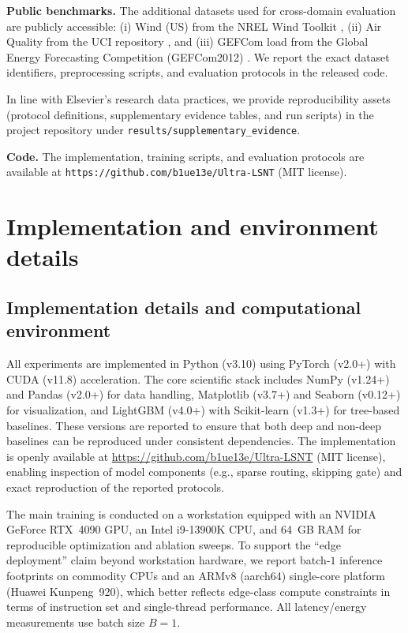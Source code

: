 \documentclass[review,3p,times]{elsarticle}
\begin{document}
\textbf{Public benchmarks.} The additional datasets used for cross-domain evaluation are publicly accessible: (i) Wind (US) from the NREL Wind Toolkit \cite{draxl2015windtoolkit}, (ii) Air Quality from the UCI repository \cite{devito2008}, and (iii) GEFCom load from the Global Energy Forecasting Competition (GEFCom2012) \cite{Hong2014GEFCom2012}. We report the exact dataset identifiers, preprocessing scripts, and evaluation protocols in the released code.

In line with Elsevier's research data practices, we provide reproducibility assets (protocol definitions, supplementary evidence tables, and run scripts) in the project repository under \texttt{results/supplementary\_evidence}.

\textbf{Code.} The implementation, training scripts, and evaluation protocols are available at \texttt{https://github.com/b1ue13e/Ultra-LSNT} (MIT license).

\appendix

\section{Implementation and environment details}\label{app:impl_details}

\subsection{Implementation details and computational environment}
\label{app:impl_details_sub}

All experiments are implemented in Python (v3.10) using PyTorch (v2.0+) with CUDA (v11.8) acceleration. The core scientific stack includes NumPy (v1.24+) and Pandas (v2.0+) for data handling, Matplotlib (v3.7+) and Seaborn (v0.12+) for visualization, and LightGBM (v4.0+) with Scikit-learn (v1.3+) for tree-based baselines. These versions are reported to ensure that both deep and non-deep baselines can be reproduced under consistent dependencies. The implementation is openly available at \url{https://github.com/b1ue13e/Ultra-LSNT} (MIT license), enabling inspection of model components (e.g., sparse routing, skipping gate) and exact reproduction of the reported protocols.

The main training is conducted on a workstation equipped with an NVIDIA GeForce RTX~4090 GPU, an Intel i9-13900K CPU, and 64~GB RAM for reproducible optimization and ablation sweeps. To support the ``edge deployment'' claim beyond workstation hardware, we report batch-$1$ inference footprints on commodity CPUs and an ARMv8 (aarch64) single-core platform (Huawei Kunpeng~920), which better reflects edge-class compute constraints in terms of instruction set and single-thread performance. All latency/energy measurements use batch size $B=1$.
\end{document}

